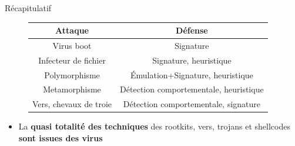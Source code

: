 \documentclass{beamer}
\begin{document}
\begin{frame}{Récapitulatif}
\begin{figure}[!ht]
\begin{tabular}{|c|c|}
\hline
\textbf{Attaque} & \textbf{Défense} \\
\hline
Virus boot & Signature \\
\hline
Infecteur de fichier & 	Signature, heuristique \\
\hline
Polymorphisme & Émulation+Signature, heuristique \\
\hline
Metamorphisme & Détection comportementale, heuristique \\
\hline
Vers, chevaux de troie & Détection comportementale, signature \\
\hline
\end{tabular}
\center
\end{figure}
\begin{itemize}
\item La \textbf{quasi totalité des techniques} des rootkits, vers, trojans et shellcodes \textbf{sont issues des virus}
\end{itemize}
\end{frame}
\end{document}

